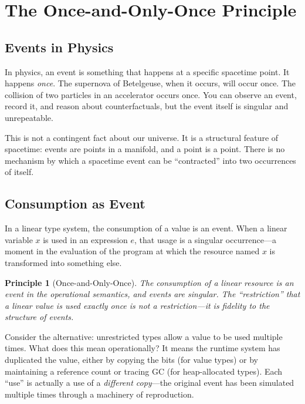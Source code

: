 \documentclass[11pt,a4paper]{article}
\newtheorem{principle}{Principle}
\begin{document}
\section{The Once-and-Only-Once Principle}
\label{sec:once}

\subsection{Events in Physics}

In physics, an event is something that happens at a specific
spacetime point. It happens \emph{once}. The supernova of Betelgeuse,
when it occurs, will occur once. The collision of two particles in
an accelerator occurs once. You can observe an event, record it, and
reason about counterfactuals, but the event itself is singular and
unrepeatable.

This is not a contingent fact about our universe. It is a structural
feature of spacetime: events are points in a manifold, and a point
is a point. There is no mechanism by which a spacetime event can be
``contracted'' into two occurrences of itself.

\subsection{Consumption as Event}

In a linear type system, the consumption of a value is an event. When
a linear variable $x$ is used in an expression $e$, that usage is a
singular occurrence---a moment in the evaluation of the program at
which the resource named $x$ is transformed into something else.

\begin{principle}[Once-and-Only-Once]
The consumption of a linear resource is an event in the operational
semantics, and events are singular. The ``restriction'' that a
linear value is used exactly once is not a restriction---it is
fidelity to the structure of events.
\end{principle}

Consider the alternative: unrestricted types allow a value to be used
multiple times. What does this mean operationally? It means the
runtime system has duplicated the value, either by copying the bits
(for value types) or by maintaining a reference count or tracing GC
(for heap-allocated types). Each ``use'' is actually a use of a
\emph{different copy}---the original event has been simulated
multiple times through a machinery of reproduction.
\end{document}

